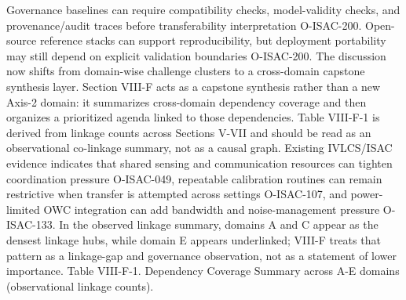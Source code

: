 \markdownRendererUlItem Governance baselines can require compatibility checks, model-validity checks, and provenance/audit traces before transferability interpretation O-ISAC-200.\markdownRendererUlItemEnd 
\markdownRendererUlItem Open-source reference stacks can support reproducibility, but deployment portability may still depend on explicit validation boundaries O-ISAC-200.\markdownRendererUlItemEnd 
\markdownRendererUlEndTight \markdownRendererInterblockSeparator
{}The discussion now shifts from domain-wise challenge clusters to a cross-domain capstone synthesis layer.\markdownRendererInterblockSeparator
{}
\markdownRendererSectionEnd 
\markdownRendererSectionEnd \markdownRendererSectionBegin
{}\markdownRendererInterblockSeparator
{}Section VIII-F acts as a capstone synthesis rather than a new Axis-2 domain: it summarizes cross-domain dependency coverage and then organizes a prioritized agenda linked to those dependencies. Table VIII-F-1 is derived from linkage counts across Sections V-VII and should be read as an observational co-linkage summary, not as a causal graph. Existing IVLCS/ISAC evidence indicates that shared sensing and communication resources can tighten coordination pressure O-ISAC-049, repeatable calibration routines can remain restrictive when transfer is attempted across settings O-ISAC-107, and power-limited OWC integration can add bandwidth and noise-management pressure O-ISAC-133. In the observed linkage summary, domains A and C appear as the densest linkage hubs, while domain E appears underlinked; VIII-F treats that pattern as a linkage-gap and governance observation, not as a statement of lower importance.\markdownRendererParagraphSeparator
{}Table VIII-F-1. Dependency Coverage Summary across A-E domains (observational linkage counts).\markdownRendererInterblockSeparator
{}\markdownRendererInterblockSeparator
